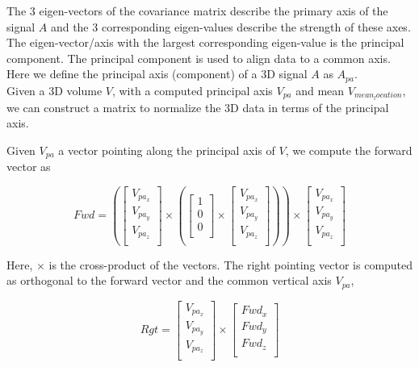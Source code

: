 The 3 eigen-vectors of the covariance matrix describe the primary axis of the signal $A$ and the 3 corresponding eigen-values describe the strength of these axes. The eigen-vector/axis with the largest corresponding eigen-value is the principal component. The principal component is used to align data to a common axis. Here we define the principal axis (component) of a 3D signal $A$ as $A_{pa}$. \\

Given a 3D volume $V$, with a computed principal axis $V_{pa}$ and mean $V_{mean_location}$, we can construct a matrix to normalize the 3D data in terms of the principal axis.

Given $V_{pa}$ a vector pointing along the principal axis of $V$, we compute the forward vector as 


\begin{equation} \label{eqn:fwdVector}
Fwd = \left(\left[
\begin{array}{c}
V_{pa_{x}}\\
V_{pa_{y}}\\
V_{pa_{z}}\\
\end{array}
\right] \times \left(\left[
\begin{array}{c}
1\\
0\\
0\\
\end{array}
\right] \times \left[
\begin{array}{c}
V_{pa_{x}}\\
V_{pa_{y}}\\
V_{pa_{z}}\\
\end{array}
\right]\right)\right) \times \left[
\begin{array}{c}
V_{pa_{x}}\\
V_{pa_{y}}\\
V_{pa_{z}}\\
\end{array}
\right]
\end{equation}

Here, $\times$ is the cross-product of the vectors. The right pointing vector is computed as orthogonal to the forward vector and the common vertical axis $V_{pa}$,


\begin{equation} \label{eqn:fwdVector}
Rgt = \left[
\begin{array}{c}
V_{pa_{x}}\\
V_{pa_{y}}\\
V_{pa_{z}}\\
\end{array}
\right] \times \left[
\begin{array}{c}
Fwd_x\\
Fwd_y\\
Fwd_z\\
\end{array}
\right]
\end{equation}

